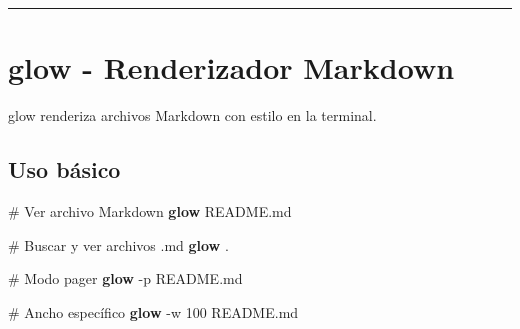 \documentclass[
  11pt,
  letterpaper,
  oneside,
  openany]{scrbook}
\newenvironment{Shaded}{}{}
\newcommand{\AttributeTok}[1]{\textcolor[rgb]{0.84,0.23,0.29}{#1}}
\newcommand{\CommentTok}[1]{\textcolor[rgb]{0.42,0.45,0.49}{#1}}
\newcommand{\ControlFlowTok}[1]{\textcolor[rgb]{0.84,0.23,0.29}{#1}}
\newcommand{\ExtensionTok}[1]{\textcolor[rgb]{0.84,0.23,0.29}{\textbf{#1}}}
\newcommand{\KeywordTok}[1]{\textcolor[rgb]{0.84,0.23,0.29}{#1}}
\newcommand{\NormalTok}[1]{\textcolor[rgb]{0.14,0.16,0.18}{#1}}
\newcommand{\SpecialStringTok}[1]{\textcolor[rgb]{0.01,0.18,0.38}{#1}}
\newcommand{\StringTok}[1]{\textcolor[rgb]{0.01,0.18,0.38}{#1}}
\newcommand{\VariableTok}[1]{\textcolor[rgb]{0.89,0.38,0.04}{#1}}
\begin{document}
\begin{Shaded}
\end{Shaded}

\begin{center}\rule{0.5\linewidth}{0.5pt}\end{center}

\section{glow - Renderizador Markdown}\label{sec-glow}

glow renderiza archivos Markdown con estilo en la terminal.

\subsection{Uso básico}\label{uso-buxe1sico-6}

\begin{Shaded}
\begin{Highlighting}[]
\CommentTok{\# Ver archivo Markdown}
\ExtensionTok{glow}\NormalTok{ README.md}

\CommentTok{\# Buscar y ver archivos .md}
\ExtensionTok{glow}\NormalTok{ .}

\CommentTok{\# Modo pager}
\ExtensionTok{glow} \AttributeTok{{-}p}\NormalTok{ README.md}

\CommentTok{\# Ancho específico}
\ExtensionTok{glow} \AttributeTok{{-}w}\NormalTok{ 100 README.md}
\end{Highlighting}
\end{Shaded}
\end{document}
